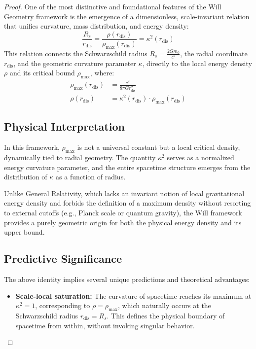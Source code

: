 \documentclass{article}
\begin{document}
\begin{theorem}
\begin{proof}
One of the most distinctive and foundational features of the Will Geometry framework is the emergence of a dimensionless, scale-invariant relation that unifies curvature, mass distribution, and energy density:
\begin{equation}
\boxed{
\frac{R_s}{r_{\text{dis}}} = \frac{\rho(r_{\text{dis}})}{\rho_{\text{max}}(r_{\text{dis}})} = \kappa^2(r_{\text{dis}})
}
\end{equation}
This relation connects the Schwarzschild radius \( R_s = \frac{2Gm_0}{c^2} \), the radial coordinate \( r_{\text{dis}} \), and the geometric curvature parameter \( \kappa \), directly to the local energy density \( \rho \) and its critical bound \( \rho_{\text{max}} \), where:
\begin{align}
\rho_{\text{max}}(r_{\text{dis}}) &= \frac{c^2}{8\pi G r_{\text{dis}}^2} \\
\rho(r_{\text{dis}}) &= \kappa^2(r_{\text{dis}}) \cdot \rho_{\text{max}}(r_{\text{dis}})
\end{align}
\subsection*{Physical Interpretation}

In this framework, \( \rho_{\text{max}} \) is not a universal constant but a local critical density, dynamically tied to radial geometry. The quantity \( \kappa^2 \) serves as a normalized energy curvature parameter, and the entire spacetime structure emerges from the distribution of \( \kappa \) as a function of radius.

Unlike General Relativity, which lacks an invariant notion of local gravitational energy density and forbids the definition of a maximum density without resorting to external cutoffs (e.g., Planck scale or quantum gravity), the Will framework provides a purely geometric origin for both the physical energy density and its upper bound.

\subsection*{Predictive Significance}

The above identity implies several unique predictions and theoretical advantages:

\begin{itemize}
  \item \textbf{Scale-local saturation:} The curvature of spacetime reaches its maximum at \( \kappa^2 = 1 \), corresponding to \( \rho = \rho_{\text{max}} \), which naturally occurs at the Schwarzschild radius \( r_{\text{dis}} = R_s \). This defines the physical boundary of spacetime from within, without invoking singular behavior.


\end{itemize}
\end{proof}
\end{theorem}
\end{document}
